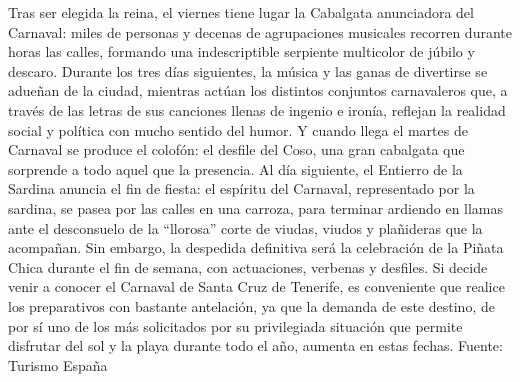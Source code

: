 \documentclass{article}%
\begin{document}
%
Tras ser elegida la reina, el viernes tiene lugar la Cabalgata anunciadora del Carnaval: miles de personas y decenas de agrupaciones musicales recorren durante horas las calles, formando una indescriptible serpiente multicolor de júbilo y descaro.%
\newline%
%
Durante los tres días siguientes, la música y las ganas de divertirse se adueñan de la ciudad, mientras actúan los distintos conjuntos carnavaleros que, a través de las letras de sus canciones llenas de ingenio e ironía, reflejan la realidad social y política con mucho sentido del humor.%
\newline%
%
Y cuando llega el martes de Carnaval se produce el colofón: el desfile del Coso, una gran cabalgata que sorprende a todo aquel que la presencia. Al día siguiente, el Entierro de la Sardina anuncia el fin de fiesta: el espíritu del Carnaval, representado por la sardina, se pasea por las calles en una carroza, para terminar ardiendo en llamas ante el desconsuelo de la “llorosa” corte de viudas, viudos y plañideras que la acompañan.%
\newline%
%
Sin embargo, la despedida definitiva será la celebración de la Piñata Chica durante el fin de semana, con actuaciones, verbenas y desfiles. Si decide venir a conocer el Carnaval de Santa Cruz de Tenerife, es conveniente que realice los preparativos con bastante antelación, ya que la demanda de este destino, de por sí uno de los más solicitados por su privilegiada situación que permite disfrutar del sol y la playa durante todo el año, aumenta en estas fechas.%
\newline%
%
Fuente: Turismo España%
\newline%
%
\end{document}
